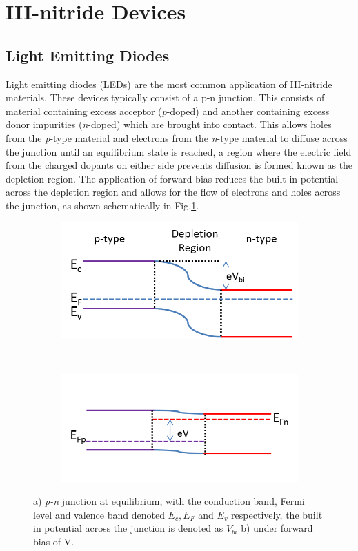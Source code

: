 \section{III-nitride Devices } %
\subsection{Light Emitting Diodes}
Light emitting diodes (LEDs) are the most common application of III-nitride materials. These devices typically consist of a {p-n} junction. This consists of material containing excess acceptor ({\it p}-doped) and another containing excess donor impurities ({\it n}-doped) which are brought into contact. This allows holes from the {\it p}-type material and electrons from the {\it n}-type material to diffuse across the junction until an equilibrium state is reached, a region where the electric field from the charged dopants on either side prevents diffusion is formed known as the depletion region. The application of forward bias reduces the built-in potential across the depletion region and allows for the flow of electrons and holes across the junction, as shown schematically in Fig.\ref{1.10}.
\begin{figure}[h]
		\hspace*{1cm}
	\begin{subfigure}[t]{0.4\textwidth}
		\centering
		\includegraphics[width = 1\textwidth]{Figs/Ch1/pn1.png}
		\caption{}
	\end{subfigure}%
	\hspace*{1cm}
	~	
	\begin{subfigure}[t]{0.4\textwidth}
		\centering
		\includegraphics[width=1\textwidth]{Figs/Ch1/pn2.png}
		\caption{}
	\end{subfigure}
	\caption {a) {\it p-n} junction at equilibrium, with the conduction band, Fermi level and valence band denoted $E_{c},E_{F}$ and $E_{v}$ respectively, the built in potential across the junction is denoted as $V_{bi}$ b) under forward bias of V.}
	\label{1.10}
\end{figure}

